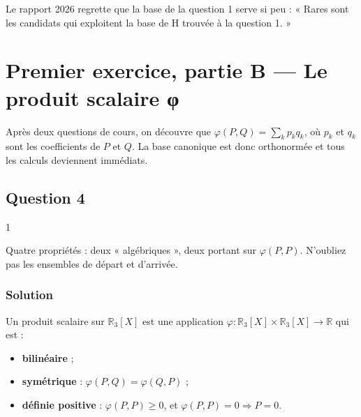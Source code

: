 \documentclass[11pt,a4paper]{article}
\providecommand{\tightlist}{\setlength{\itemsep}{0pt}\setlength{\parskip}{0pt}}
\begin{document}
\begin{jury}

Le rapport 2026 regrette que la base de la question 1 serve si peu : « Rares sont les candidats qui exploitent la base de H trouvée à la question 1. »

\end{jury}

\hypertarget{premier-exercice-partie-b-le-produit-scalaire-ux3c6}{%
\section{Premier exercice, partie B --- Le produit scalaire φ}\label{premier-exercice-partie-b-le-produit-scalaire-ux3c6}}

Après deux questions de cours, on découvre que \(\varphi(P,Q)=\sum_k p_kq_k\), où \(p_k\) et \(q_k\) sont les coefficients de \(P\) et \(Q\). La base canonique est donc orthonormée et tous les calculs deviennent immédiats.

\hypertarget{question-4}{%
\subsection{Question 4}\label{question-4}}

\begin{indication}{1}

Quatre propriétés : deux « algébriques », deux portant sur \(\varphi(P,P)\). N'oubliez pas les ensembles de départ et d'arrivée.

\end{indication}

\hypertarget{solution-3}{%
\subsubsection{Solution}\label{solution-3}}

Un produit scalaire sur \({\mathbb{R}}_3[X]\) est une application \(\varphi:{\mathbb{R}}_3[X]\times{\mathbb{R}}_3[X]\to\mathbb{R}\) qui est :

\begin{itemize}
\tightlist
\item
  \textbf{bilinéaire} ;
\item
  \textbf{symétrique} : \(\varphi(P,Q)=\varphi(Q,P)\) ;
\item
  \textbf{définie positive} : \(\varphi(P,P)\geqslant0\), et \(\varphi(P,P)=0\Rightarrow P=0\).
\end{itemize}
\end{document}
